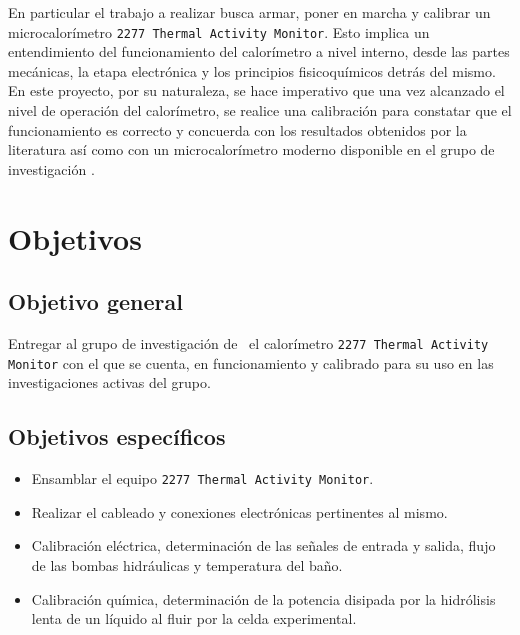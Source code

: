 	En particular el trabajo a realizar busca armar, poner en marcha y calibrar un microcalorímetro \texttt{2277 Thermal Activity Monitor}. Esto implica un entendimiento del funcionamiento del calorímetro a nivel interno, desde las partes mecánicas, la etapa electrónica y los principios fisicoquímicos detrás del mismo. En este proyecto, por su naturaleza, se hace imperativo que una vez alcanzado el nivel de operación del calorímetro, se realice una calibración para constatar que el funcionamiento es correcto y concuerda con los resultados obtenidos por la literatura así como con un microcalorímetro moderno disponible en el grupo de investigación \textit{\groupname}.
	
\section{Objetivos}
	\subsection{Objetivo general}
		Entregar al grupo de investigación de \groupname\ el calorímetro \texttt{2277 Thermal Activity Monitor} con el que se cuenta, en funcionamiento y calibrado para su uso en las investigaciones activas del grupo.
		
	\subsection{Objetivos específicos}
		\begin{itemize}
			\item Ensamblar el equipo \texttt{2277 Thermal Activity Monitor}.
			\item Realizar el cableado y conexiones electrónicas pertinentes al mismo.
			\item Calibración eléctrica, determinación de las señales de entrada y salida, flujo de las bombas hidráulicas y temperatura del baño.
			\item Calibración química, determinación de la potencia disipada por la hidrólisis lenta de un líquido al fluir por la celda experimental.
		\end{itemize}

